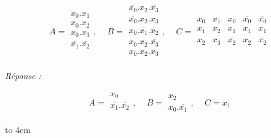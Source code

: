\begin{enumerate} [label=\arabic*$^\circ$]
\[ A = 
\begin{array}{|c|} 
    x_0 . x_1 \\
    x_0 . x_2 \\
    x_0 . x_3 \\
    \overline{x_1} . \overline{x_2} \\     
\end{array}%
\text{, } \quad  B = \begin{array}{|c|} 
					\overline{x_0} . x_2 . \overline{x_3} \\
					\overline{x_0} . x_2 . x_3  \\
					x_0 . \overline{x_1} . \overline{x_2} \\
					x_0  . x_2 . \overline{x_3} \\
					x_0 . x_2 . x_3 \\
                  \end{array} 
                  \text{, } \quad C = \begin{array}{|c|c|c|c|c|} 
                  					x_0 & x_1 & x_0 & \overline{x_0} & \overline{x_0} \\
                  					x_1 & x_2 & x_1 & x_1 & x_1 \\
                  					x_2 & x_3 & \overline{x_2} & x_2 & \overline{x_2} \\
                                  \end{array} 
\]




 \emph{Réponse :}
 

 
 \[ A = 
 \begin{array}{|c|}    x_0 \\ \overline{x_1} . \overline{x_2} \\   \end{array}
       \text{, } \quad B = \begin{array}{|c|} x_2 \\ x_0 . \overline{x_1} \end{array} 
           \text{, } \quad C = x_1 
 \]
 
\vspace*{4cm }

\centerline { \hfill \hbox to 4cm  { \hrulefill } \hfill }
\end{enumerate}
